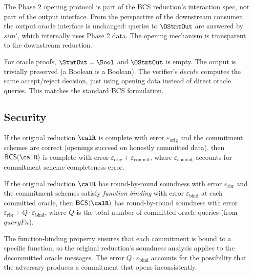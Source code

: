 \begin{remark}
  The Phase 2 opening protocol is part of the BCS reduction's interaction
  spec, not part of the output interface.
  From the perspective of the downstream consumer, the output oracle
  interface is unchanged: queries to $\OStmtOut$ are answered by
  $\mathit{sim}'$, which internally uses Phase 2 data.
  The opening mechanism is transparent to the downstream reduction.
\end{remark}

\begin{remark}
  For oracle proofs, $\StmtOut = \Bool$ and $\OStmtOut$ is empty.
  The output is trivially preserved (a Boolean is a Boolean).
  The verifier's $\mathit{decide}$ computes the same accept/reject decision,
  just using opening data instead of direct oracle queries.
  This matches the standard BCS formulation.
\end{remark}

\subsection{Security}

\begin{definition}
  \label{bcs:completeness}
  If the original reduction $\calR$ is complete with error
  $\varepsilon_{\mathrm{orig}}$ and the commitment schemes are correct
  (openings succeed on honestly committed data), then
  $\mathsf{BCS}(\calR)$ is complete with error
  $\varepsilon_{\mathrm{orig}} + \varepsilon_{\mathrm{commit}}$,
  where $\varepsilon_{\mathrm{commit}}$ accounts for commitment scheme
  completeness error.
\end{definition}

\begin{definition}
  \label{bcs:soundness}
  If the original reduction $\calR$ has round-by-round soundness with
  error $\varepsilon_{\mathrm{rbr}}$ and the commitment schemes satisfy
  \emph{function binding} with error $\varepsilon_{\mathrm{bind}}$ at each
  committed oracle, then $\mathsf{BCS}(\calR)$ has round-by-round
  soundness with error
  $\varepsilon_{\mathrm{rbr}} + Q \cdot \varepsilon_{\mathrm{bind}}$,
  where $Q$ is the total number of committed oracle queries (from
  $\mathit{queryFn}$).

  The function-binding property ensures that each commitment is bound to a
  specific function, so the original reduction's soundness analysis applies
  to the decommitted oracle messages.
  The error $Q \cdot \varepsilon_{\mathrm{bind}}$ accounts for the
  possibility that the adversary produces a commitment that opens
  inconsistently.
\end{definition}

